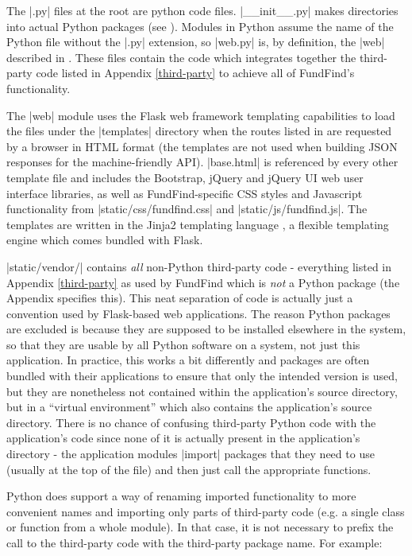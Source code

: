 The |.py| files at the root are python code files. |__init__.py| makes directories into actual Python packages (see ). Modules in Python assume the name of the Python file without the |.py| extension, so |web.py| is, by definition, the |web| described in . These files contain the code which integrates together the third-party code listed in Appendix \ref{third-party} to achieve all of FundFind's functionality.

The |web| module uses the Flask web framework templating capabilities to load the files under the |templates| directory when the routes listed in  are requested by a browser in HTML format (the templates are not used when building JSON responses for the machine-friendly API). |base.html| is referenced by every other template file and includes the Bootstrap, jQuery and jQuery UI web user interface libraries, as well as FundFind-specific CSS styles and Javascript functionality from |static/css/fundfind.css| and |static/js/fundfind.js|. The templates are written in the Jinja2 templating language \cite{jinja2}, a flexible templating engine which comes bundled with Flask.

|static/vendor/| contains \emph{all} non-Python third-party code - everything listed in Appendix \ref{third-party} as used by FundFind which is \emph{not} a Python package (the Appendix specifies this). This neat separation of code is actually just a convention used by Flask-based web applications. The reason Python packages are excluded is because they are supposed to be installed elsewhere in the system, so that they are usable by all Python software on a system, not just this application. In practice, this works a bit differently and packages are often bundled with their applications to ensure that only the intended version is used, but they are nonetheless not contained within the application's source directory, but in a ``virtual environment'' which also contains the application's source directory. There is no chance of confusing third-party Python code with the application's code since none of it is actually present in the application's directory - the application modules |import| packages that they 
need to use (usually at the top of the file) and then just call the appropriate functions.

Python does support a way of renaming imported functionality to more convenient names and importing only parts of third-party code (e.g. a single class or function from a whole module). In that case, it is not necessary to prefix the call to the third-party code with the third-party package name. For example:

